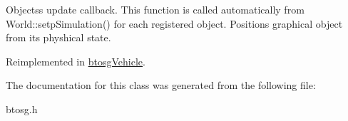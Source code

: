 Objects\textquotesingle{}s update callback. This function is called automatically from World\+::setp\+Simulation() for each registered object. Positions graphical object from its physhical state. 

Reimplemented in \hyperlink{classbtosgVehicle_a5fd0f471df492ac232c9b772a28bd2b9}{btosg\+Vehicle}.



The documentation for this class was generated from the following file\+:\begin{DoxyCompactItemize}
\item 
btosg.\+h\end{DoxyCompactItemize}

